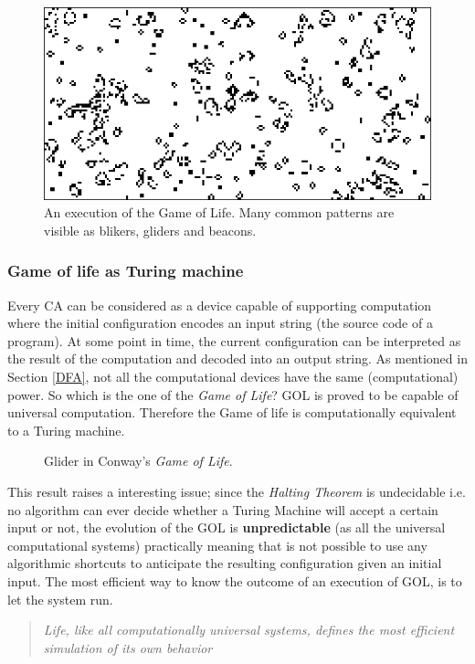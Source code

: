 \begin{figure}
\centering
\caption[GOL execution example.]{An execution of the Game of Life. Many common patterns are visible as blikers, gliders and beacons.}
\label{gameoflife}
\includegraphics[width=1.0\textwidth]{./images/CA_FDM/game-of-life}
\end{figure}

\subsubsection{Game of life as Turing machine}
Every CA can be considered as a device capable of supporting computation where the
initial configuration  encodes an input string (the source code of a program). At
some point in time, the current configuration can be interpreted as the result of the
computation and decoded into an output string. As mentioned in Section
\ref{DFA}, not all the computational devices have the same (computational) power.
So which is the one of the \textit{Game of Life}? GOL is proved to be capable of universal computation.
Therefore the Game of life is computationally equivalent to a Turing machine\cite{berlekamp1982}.
\begin{figure}
\centering
\caption[The \textit{Glider} block in the Conway's \textit{Game of Life}.]{Glider in Conway's \textit{Game of Life}.}
\label{fig:glider}
\setlength{\fboxrule}{1pt}%
\end{figure}
This result raises a interesting issue; since the \emph{Halting
Theorem} is undecidable i.e. no algorithm can ever decide whether a Turing Machine will accept a certain input or not,
the evolution of the GOL is \textbf{unpredictable} (as all the universal computational systems) practically meaning that is
not possible to use any algorithmic shortcuts to anticipate the resulting
configuration given an initial input. 
The most efficient way to know the outcome of an execution of GOL, is to let the system run.
\begin{quotation}
\em Life, like all computationally universal systems, defines the most efficient
simulation of its own behavior\cite{Ilachinski2001}
\end{quotation}

